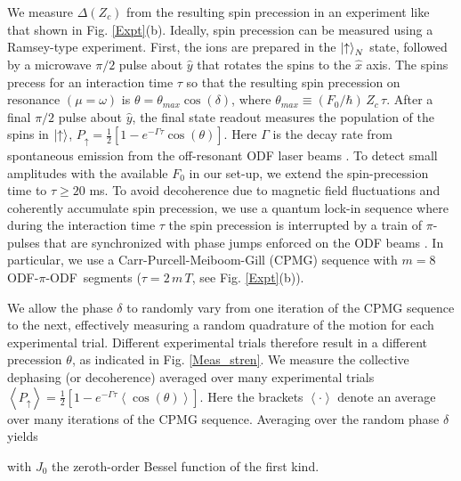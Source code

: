 \documentclass[aps,prl,twocolumn,superscriptaddress,floatfix]{revtex4-1}
\begin{document}
We measure $\Delta(Z_c)$ from the resulting spin precession in an experiment like that shown in Fig. \ref{Expt}(b). Ideally, spin precession can be measured using a Ramsey-type experiment. First, the ions are prepared in the $\ket{\uparrow}_N$ state, followed by a microwave $\pi/2$ pulse about $\hat{y}$ that rotates the spins to the $\hat{x}$ axis. The spins precess for an interaction time $\tau$ so that the resulting spin precession on resonance $(\mu = \omega)$ is $\theta = \theta_{max} \cos(\delta)$, where $\theta_{max} \equiv (F_{0}/\hbar)\, Z_c \, \tau$. After a final $\pi/2$ pulse about $\hat{y}$, the final state readout measures the population of the spins in $\ket{\uparrow}$, $P_{\uparrow} = \frac{1}{2}[1-e^{-\Gamma \tau}\cos(\theta)]$. Here $\Gamma$ is the decay rate from spontaneous emission from the off-resonant ODF laser beams \citep{Uys2010}. To detect small amplitudes with the available $F_0$ in our set-up, we extend the spin-precession time to $\tau \ge 20$ ms. To avoid decoherence due to magnetic field fluctuations and coherently accumulate spin precession, we use a quantum lock-in \citep{Kotler2011} sequence where during the interaction time $\tau$ the spin precession is interrupted by a train of $\pi$-pulses that are synchronized with phase jumps enforced on the ODF beams \citep{SuppMat}. In particular, we use a Carr-Purcell-Meiboom-Gill (CPMG) sequence with $m = 8$ \mbox{ODF-$\pi$-ODF segments} ($\tau = 2\, m \, T$, see Fig. \ref{Expt}(b)).

We allow the phase $\delta$ to randomly vary from one iteration of the CPMG sequence to the next, effectively measuring a random quadrature of the motion for each experimental trial. Different experimental trials therefore result in a different precession $\theta$, as indicated in Fig. \ref{Meas_stren}. We measure the collective dephasing (or decoherence) averaged over many experimental trials $\left< P_{\uparrow} \right> = \frac{1}{2}[1-e^{-\Gamma \tau} \left<\cos(\theta)\right>]$. Here the brackets $ \left< \cdot \right> $ denote an average over many iterations of the CPMG sequence. Averaging over the random phase $\delta$ yields~\citep{Kotler2013}

with $J_0$ the zeroth-order Bessel function of the first kind.
\end{document}
